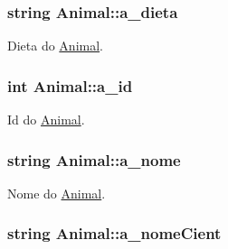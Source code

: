 \subsubsection[{\texorpdfstring{a\+\_\+dieta}{a_dieta}}]{\setlength{\rightskip}{0pt plus 5cm}string Animal\+::a\+\_\+dieta\hspace{0.3cm}{\ttfamily [protected]}}\hypertarget{classAnimal_a32088524517a531af269e3ec04275135}{}\label{classAnimal_a32088524517a531af269e3ec04275135}


Dieta do \hyperlink{classAnimal}{Animal}. 

\subsubsection[{\texorpdfstring{a\+\_\+id}{a_id}}]{\setlength{\rightskip}{0pt plus 5cm}int Animal\+::a\+\_\+id\hspace{0.3cm}{\ttfamily [protected]}}\hypertarget{classAnimal_a1eab12d1133a739dc0fea720cf6cc927}{}\label{classAnimal_a1eab12d1133a739dc0fea720cf6cc927}


Id do \hyperlink{classAnimal}{Animal}. 

\subsubsection[{\texorpdfstring{a\+\_\+nome}{a_nome}}]{\setlength{\rightskip}{0pt plus 5cm}string Animal\+::a\+\_\+nome\hspace{0.3cm}{\ttfamily [protected]}}\hypertarget{classAnimal_ad815bbe345d7c5274858ac8ccb24bc52}{}\label{classAnimal_ad815bbe345d7c5274858ac8ccb24bc52}


Nome do \hyperlink{classAnimal}{Animal}. 

\subsubsection[{\texorpdfstring{a\+\_\+nome\+Cient}{a_nomeCient}}]{\setlength{\rightskip}{0pt plus 5cm}string Animal\+::a\+\_\+nome\+Cient\hspace{0.3cm}{\ttfamily [protected]}}\hypertarget{classAnimal_af2ae0fc23b0eaf3edaee4579f6199dfc}{}\label{classAnimal_af2ae0fc23b0eaf3edaee4579f6199dfc}


